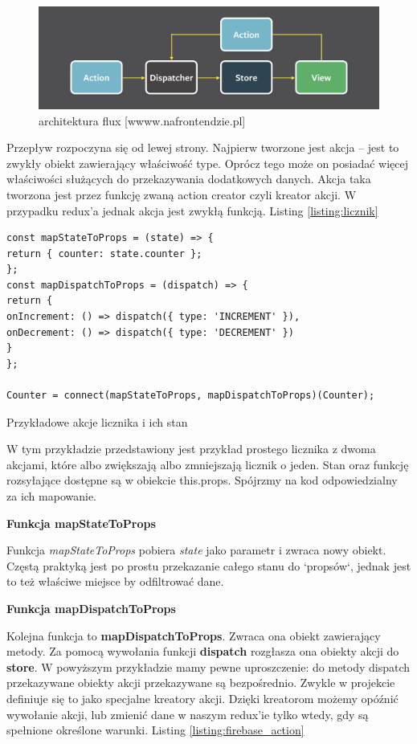 \begin{figure}
	\centering\includegraphics[width=.6\textwidth]{img/flux}
	\caption{architektura flux [wwww.nafrontendzie.pl]}\label{rys:flux}%
\end{figure}

Przepływ rozpoczyna się od lewej strony. Najpierw tworzone jest akcja – jest to zwykły obiekt zawierający właściwość type. Oprócz tego może on posiadać więcej właściwości służących do przekazywania dodatkowych danych. Akcja taka tworzona jest przez funkcję zwaną action creator czyli kreator akcji. W przypadku redux'a jednak akcja jest zwykłą funkcją. Listing \ref{listing:licznik}

\begin{listing}
\begin{verbatim}
const mapStateToProps = (state) => {
return { counter: state.counter };
};
const mapDispatchToProps = (dispatch) => {
return {
onIncrement: () => dispatch({ type: 'INCREMENT' }),
onDecrement: () => dispatch({ type: 'DECREMENT' })
}
};

Counter = connect(mapStateToProps, mapDispatchToProps)(Counter);
\end{verbatim}
\caption{Przykładowe akcje licznika i ich stan} \label{listing:licznik}
\end{listing}

W tym przykładzie przedstawiony jest przykład prostego licznika z dwoma akcjami, które albo zwiększają albo zmniejszają licznik o jeden. Stan oraz funkcję rozsyłające dostępne są w obiekcie this.props. Spójrzmy na kod odpowiedzialny za ich mapowanie.
\begin{center}
	\textbf{Funkcja mapStateToProps}
\end{center}
Funkcja \textit{mapStateToProps} pobiera \textit{state} jako parametr i zwraca nowy obiekt. Częstą praktyką jest po prostu przekazanie całego stanu do `propsów`, jednak jest to też właściwe miejsce by odfiltrować dane. 
\begin{center}
	\textbf{Funkcja mapDispatchToProps}
\end{center}
Kolejna funkcja to \textbf{mapDispatchToProps}. Zwraca ona obiekt zawierający metody. Za pomocą wywołania funkcji \textbf{dispatch} rozgłasza ona obiekty akcji do \textbf{store}. W powyższym przykładzie mamy pewne uproszczenie: do metody dispatch przekazywane obiekty akcji przekazywane są bezpośrednio. Zwykle w projekcie definiuje się to jako specjalne kreatory akcji. Dzięki kreatorom możemy opóźnić wywołanie akcji, lub zmienić dane w naszym redux'ie tylko wtedy, gdy są spełnione określone warunki. Listing \ref{listing:firebase_action}

